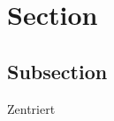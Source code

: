 \documentclass[a4paper,12pt]{article}
\begin{document}
\section{Section}
\subsection{Subsection}


\begin{center}
 Zentriert
\end{center}
\end{document}
